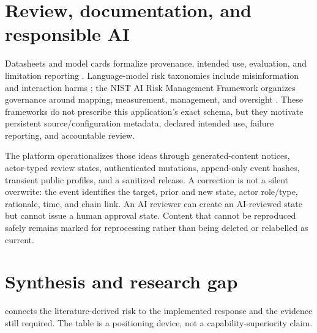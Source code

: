 \section{Review, documentation, and responsible AI}

Datasheets and model cards formalize provenance, intended use, evaluation, and limitation reporting \cite{gebru2021datasheets,mitchell2019modelcards}. Language-model risk taxonomies include misinformation and interaction harms \cite{weidinger2022taxonomy}; the NIST AI Risk Management Framework organizes governance around mapping, measurement, management, and oversight \cite{tabassi2023airmf}. These frameworks do not prescribe this application's exact schema, but they motivate persistent source/configuration metadata, declared intended use, failure reporting, and accountable review.

The platform operationalizes those ideas through generated-content notices, actor-typed review states, authenticated mutations, append-only event hashes, transient public profiles, and a sanitized release. A correction is not a silent overwrite: the event identifies the target, prior and new state, actor role/type, rationale, time, and chain link. An AI reviewer can create an AI-reviewed state but cannot issue a human approval state. Content that cannot be reproduced safely remains marked for reprocessing rather than being deleted or relabelled as current.

\section{Synthesis and research gap}

 connects the literature-derived risk to the implemented response and the evidence still required. The table is a positioning device, not a capability-superiority claim.

